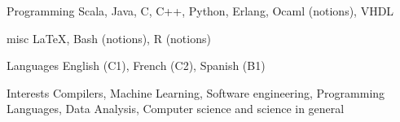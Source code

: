 


\begin{cvskills}


\cvskill
{Programming} %
{Scala, Java, C, C++, Python, Erlang, Ocaml (notions), VHDL} %


\cvskill
{misc} %
{\LaTeX, Bash (notions), R (notions)} %


\cvskill
{Languages} %
{English (C1), French (C2), Spanish (B1)} %


\cvskill
{Interests} %
{Compilers, Machine Learning, Software engineering, Programming Languages, Data Analysis, Computer science and science in general} %


\end{cvskills}